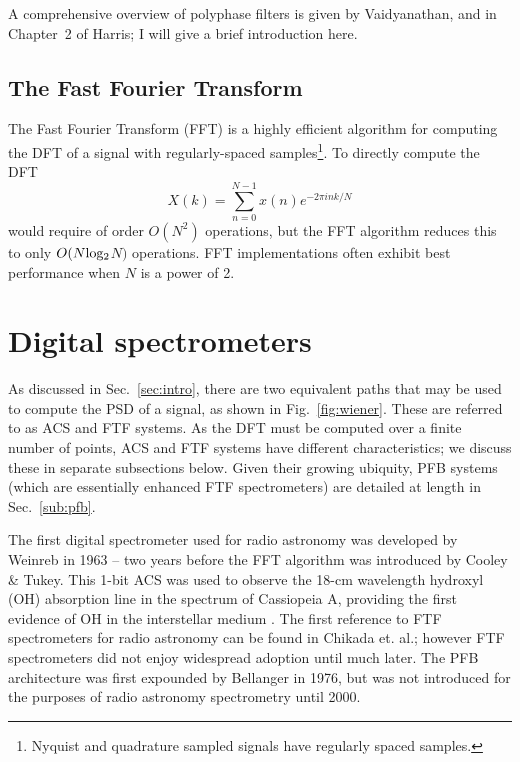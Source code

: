 \documentclass{ws-rv961x669}
\begin{document}


A comprehensive overview of polyphase filters is given by Vaidyanathan\citet{Vaidyanathan:1990p6127}, and in Chapter~2 of Harris\citet{BookHarrisMultirateDSP}; I will give a brief introduction here. 


\subsection{The Fast Fourier Transform\label{sub:fft}}

The Fast Fourier Transform\cite{Cooley1965} (FFT) is a highly efficient algorithm for computing the DFT of a signal with regularly-spaced samples\footnote{Nyquist and quadrature sampled signals have regularly spaced samples.}. To directly compute the DFT
\begin{equation}
X(k)=\sum_{n=0}^{N-1}x(n)e^{-2\pi ink/N}\label{eq:dft1}
\end{equation}
would require of order $O(N^2)$ operations, but the FFT algorithm reduces this to only $O(N \rm{log_2}$$N)$ operations. FFT implementations often exhibit best performance when $N$ is a power of 2. 




\section{Digital spectrometers}
As discussed in Sec.~\ref{sec:intro}, there are two equivalent paths that may be used to compute the PSD of a signal, as shown in  Fig.~\ref{fig:wiener}. These are referred to as ACS and FTF systems. As the DFT must be computed over a finite number of points, ACS and FTF systems have different characteristics; we discuss these in separate subsections below. Given their growing ubiquity, PFB systems (which are essentially enhanced FTF spectrometers) are detailed at length in Sec.~\ref{sub:pfb}.

The first digital spectrometer used for radio astronomy was developed by Weinreb\citet{Weinreb:1963p10042} in 1963 -- two years before the FFT algorithm was introduced by Cooley \& Tukey\cite{Cooley1965}. This 1-bit ACS was used to observe the 18-cm wavelength hydroxyl (OH) absorption line in the spectrum of Cassiopeia A, providing the first evidence of OH in the interstellar medium \citep{Weinreb:1963p9992}. The first reference to FTF spectrometers for radio astronomy can be found in Chikada et. al.\citet{Chikada:1987p10044}; however FTF spectrometers did not enjoy widespread adoption until much later. The PFB architecture was first expounded by Bellanger\cite{Bellanger:1976p7898} in 1976, but was not introduced for the purposes of radio astronomy spectrometry until 2000\cite{Bunton2000}.
\end{document}
